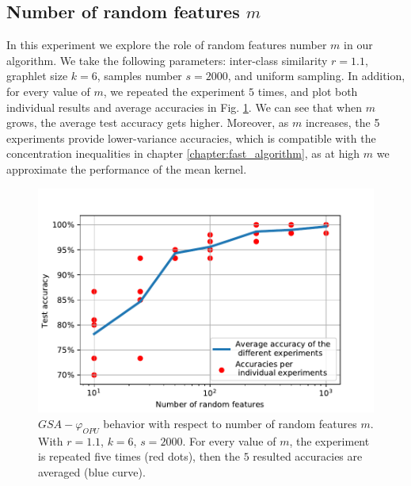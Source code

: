 \subsection{Number of random features $m$}
In this experiment we explore the role of random features number $m$ in our algorithm. 
We take the following parameters: inter-class similarity $r=1.1$, graphlet size $k=6$, samples number $s=2000$, and uniform sampling.
In addition, for every value of $m$, we repeated the experiment $5$ times, and plot both individual results and average accuracies in Fig. \ref{fig:varying_random_features}. We can see that when $m$ grows, the average test accuracy gets higher. Moreover, as $m$ increases, the 5 experiments provide lower-variance accuracies, which is compatible with the concentration inequalities in chapter \ref{chapter:fast_algorithm}, as at high $m$ we approximate the performance of the mean kernel.

\begin{figure}[H]
\centering
\includegraphics[scale=0.6]{figs/LightON_adj_SBM_varying_RF.PDF}
\caption[$GSA-\varphi_{OPU}$ behavior with respect to number of random features $m$]{$GSA-\varphi_{OPU}$ behavior with respect to number of random features $m$. With $r=1.1$, $k=6$, $s=2000$. For every value of $m$, the experiment is repeated five times (red dots), then the $5$ resulted accuracies are averaged (blue curve).}
\label{fig:varying_random_features}
\end{figure}

